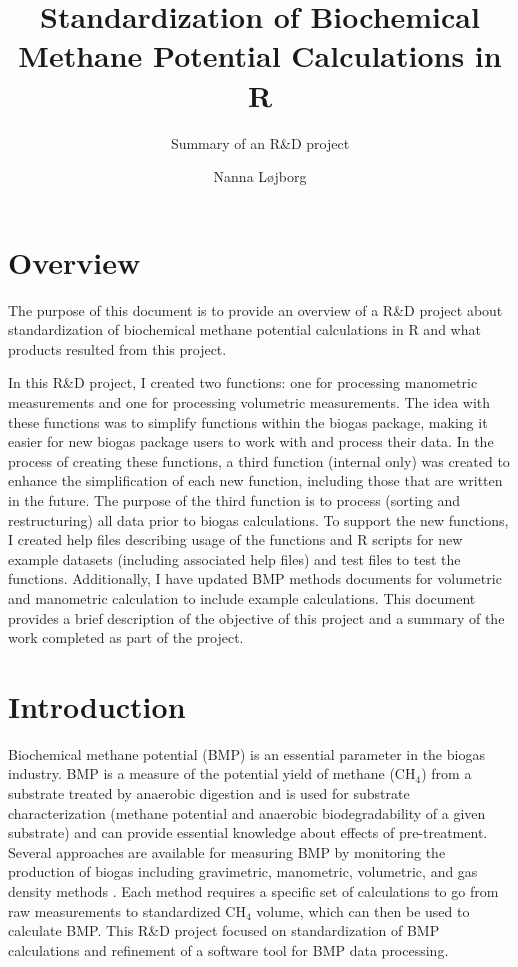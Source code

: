 \documentclass{article}
\title{Standardization of Biochemical Methane Potential Calculations in R}
\subtitle{\vspace{0.3cm}Summary of an R\&D project}
\author{Nanna L\o jborg}
\begin{document}


\maketitle
\section{Overview}
The purpose of this document is to provide an overview of a R\&D project about standardization of biochemical methane potential calculations in R and what products resulted from this project.

In this R\&D project, I created two functions: one for processing manometric measurements and one for processing volumetric measurements. The idea with these functions was to simplify functions within the biogas package, making it easier for new biogas package users to work with and process their data. In the process of creating these functions, a third function (internal only) was created to enhance the simplification of each new function, including those that are written in the future. The purpose of the third function is to process (sorting and restructuring) all data prior to biogas calculations. To support the new functions, I created help files describing usage of the functions and R scripts for new example datasets (including associated help files) and test files to test the functions. Additionally, I have updated BMP methods documents for volumetric and manometric calculation to include example calculations.  
This document provides a brief description of the objective of this project and a summary of the work completed as part of the project.

\section{Introduction}
Biochemical methane potential (BMP) is an essential parameter in the biogas industry. BMP is a measure of the potential yield of methane (CH$_4$) from a substrate treated by anaerobic digestion and is used for substrate characterization (methane potential and anaerobic biodegradability of a given substrate) and can provide essential knowledge about effects of pre-treatment. Several approaches are available for measuring BMP by monitoring the production of biogas including gravimetric, manometric, volumetric, and gas density methods \cite{filer_BMP_2019}. Each method requires a specific set of calculations to go from raw measurements to standardized CH$_4$ volume, which can then be used to calculate BMP. This R\&D project focused on standardization of BMP calculations and refinement of a software tool for BMP data processing.
\end{document}
